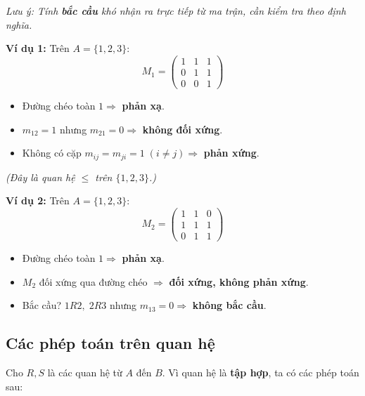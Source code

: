 \documentclass[12pt,a4paper]{article}
\begin{document}
\vspace{4pt}
\textit{Lưu ý: Tính \textbf{bắc cầu} khó nhận ra trực tiếp từ ma trận, cần kiểm tra theo định nghĩa.}

\vspace{4pt}
\noindent
\begin{minipage}[t]{0.48\textwidth}
\textbf{\textcolor{AccentRed}{Ví dụ 1:}} Trên $A = \{1, 2, 3\}$:
\[
  M_1 = \begin{pmatrix} 1 & 1 & 1 \\ 0 & 1 & 1 \\ 0 & 0 & 1 \end{pmatrix}
\]
\begin{itemize}
  \item Đường chéo toàn $1 \Rightarrow$ \textbf{phản xạ}.
  \item $m_{12} = 1$ nhưng $m_{21} = 0 \Rightarrow$ \textbf{không đối xứng}.
  \item Không có cặp $m_{ij} = m_{ji} = 1\;(i \neq j) \Rightarrow$ \textbf{phản xứng}.
\end{itemize}
\textit{(Đây là quan hệ $\le$ trên $\{1, 2, 3\}$.)}
\end{minipage}
\hfill
\begin{minipage}[t]{0.48\textwidth}
\textbf{\textcolor{AccentRed}{Ví dụ 2:}} Trên $A = \{1, 2, 3\}$:
\[
  M_2 = \begin{pmatrix} 1 & 1 & 0 \\ 1 & 1 & 1 \\ 0 & 1 & 1 \end{pmatrix}
\]
\begin{itemize}
  \item Đường chéo toàn $1 \Rightarrow$ \textbf{phản xạ}.
  \item $M_2$ đối xứng qua đường chéo $\Rightarrow$ \textbf{đối xứng, không phản xứng}.
  \item Bắc cầu? $1 R 2,\; 2 R 3$ nhưng $m_{13} = 0 \Rightarrow$ \textbf{không bắc cầu}.
\end{itemize}
\end{minipage}

\subsection{Các phép toán trên quan hệ}

Cho $R, S$ là các quan hệ từ $A$ đến $B$. Vì quan hệ là \textbf{tập hợp}, ta có các phép toán sau:
\end{document}
